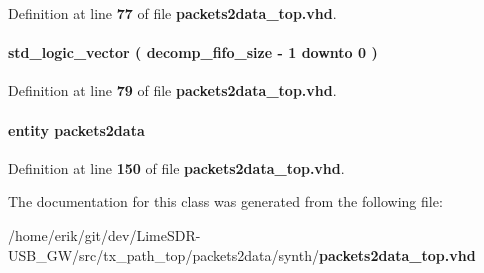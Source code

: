 Definition at line {\bf 77} of file {\bf packets2data\+\_\+top.\+vhd}.

\paragraph[{max\+\_\+fifo\+\_\+words}]{ {\bfseries \textcolor{comment}{std\+\_\+logic\+\_\+vector}\textcolor{vhdlchar}{ }\textcolor{vhdlchar}{(}\textcolor{vhdlchar}{ }\textcolor{vhdlchar}{ }\textcolor{vhdlchar}{ }\textcolor{vhdlchar}{ }{\bfseries {\bf decomp\+\_\+fifo\+\_\+size}} \textcolor{vhdlchar}{-\/}\textcolor{vhdlchar}{ } \textcolor{vhdldigit}{1} \textcolor{vhdlchar}{ }\textcolor{keywordflow}{downto}\textcolor{vhdlchar}{ }\textcolor{vhdlchar}{ } \textcolor{vhdldigit}{0} \textcolor{vhdlchar}{ }\textcolor{vhdlchar}{)}\textcolor{vhdlchar}{ }} \hspace{0.3cm}{\ttfamily [Signal]}}\label{classpackets2data__top_1_1arch_a0bae996bc58ac304caffd0033c4af708}


Definition at line {\bf 79} of file {\bf packets2data\+\_\+top.\+vhd}.

\paragraph[{packets2data\+\_\+inst0}]{ {\bfseries \textcolor{keywordflow}{entity}\textcolor{vhdlchar}{ }\textcolor{vhdlchar}{packets2data}\textcolor{vhdlchar}{ }} \hspace{0.3cm}{\ttfamily [Instantiation]}}\label{classpackets2data__top_1_1arch_a54ce22454660953ddb623ab123ea56bf}


Definition at line {\bf 150} of file {\bf packets2data\+\_\+top.\+vhd}.



The documentation for this class was generated from the following file\+:\begin{DoxyCompactItemize}
\item 
/home/erik/git/dev/\+Lime\+S\+D\+R-\/\+U\+S\+B\+\_\+\+G\+W/src/tx\+\_\+path\+\_\+top/packets2data/synth/{\bf packets2data\+\_\+top.\+vhd}\end{DoxyCompactItemize}
